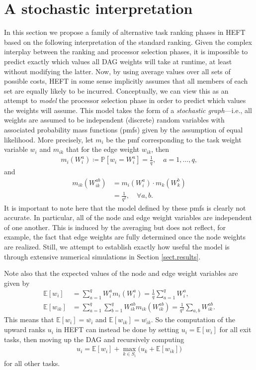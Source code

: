 \documentclass[12pt]{article}
\def\P{\mathbb{P}}
\def\E{\mathbb{E}}
\begin{document}
\section{A stochastic interpretation}
\label{sect.alt_rankings}

In this section we propose a family of alternative task ranking phases in HEFT based on the following interpretation of the standard ranking. Given the complex interplay between the ranking and processor selection phases, it is impossible to predict exactly which values all DAG weights will take at runtime, at least without modifying the latter. Now, by using average values over all sets of possible costs, HEFT in some sense implicitly assumes that all members of each set are equally likely to be incurred. Conceptually, we can view this as an attempt to {\em model} the processor selection phase in order to predict which values the weights will assume. This model takes the form of a {\em stochastic graph}---i.e., all weights are assumed to be independent (discrete) random variables with associated probability mass functions (pmfs) given by the assumption of equal likelihood. More precisely, let $m_i$ be the pmf corresponding to the task weight variable $w_i$ and $m_{ik}$ that for the edge weight $w_{ik}$, then  
\begin{align*}
m_i(W_i^a) \coloneqq \P[w_i = W_i^a] = \frac{1}{q}, \quad a = 1, \dots, q,
\end{align*}
and   
\begin{align*}
m_{ik}(W_{ik}^{ab}) &= m_i(W_i^a) \cdot m_k(W_k^b) \\
&= \frac{1}{q^2}, \quad \forall a, b.
\end{align*}
It is important to note here that the model defined by these pmfs is clearly not accurate. In particular, all of the node and edge weight variables are independent of one another. This is induced by the averaging but does not reflect, for example, the fact that edge weights are fully determined once the node weights are realized. Still, we attempt to establish exactly how useful the model is through extensive numerical simulations in Section \ref{sect.results}.     

Note also that the expected values of the node and edge weight variables are given by
\begin{align}
\E[w_i] &= \sum_{a = 1}^{q} W_i^a m_i(W_i^a) = \frac{1}{q} \sum_{a = 1}^{q} W_i^a, \label{eq.expected_node}\\
\E[w_{ik}] &= \sum_{a = 1}^{q} \sum_{b = 1}^{q}  W_{ik}^{ab} m_{ik}(W_{ik}^{ab}) = \frac{1}{q^2} \sum_{a, b} W_{ik}^{ab} \label{eq.expected_edge}.
\end{align}
This means that $\E[w_i] = \overline{w_i}$ and $\E[w_{ik}] = \overline{w_{ik}}$. So the computation of the upward ranks $u_i$ in HEFT can instead be done by setting $u_i = \E[w_i]$ for all exit tasks, then moving up the DAG and recursively computing
\begin{align}
u_i = \E[w_i] + \max_{k \in S_i} \big( u_k + \E[w_{ik}] \big) \label{eq.ur_expectation}
\end{align}
for all other tasks. 
\end{document}
